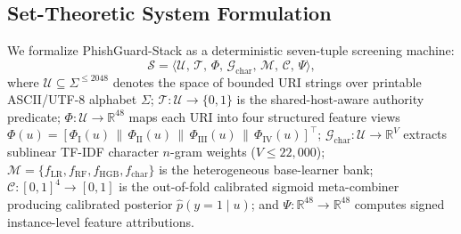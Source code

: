 \documentclass[conference]{IEEEtran}
\begin{document}
\subsection{Set-Theoretic System Formulation}
We formalize PhishGuard-Stack as a deterministic seven-tuple screening machine:
\begin{equation}
\mathcal{S} = \langle \mathcal{U},\, \mathcal{T},\, \Phi,\, \mathcal{G}_{\text{char}},\, \mathcal{M},\, \mathcal{C},\, \Psi \rangle,
\label{eq:tuple}
\end{equation}
where $\mathcal{U} \subseteq \Sigma^{\le 2048}$ denotes the space of bounded URI strings over printable ASCII/UTF-8 alphabet $\Sigma$; $\mathcal{T}: \mathcal{U} \to \{0,1\}$ is the shared-host-aware authority predicate; $\Phi: \mathcal{U} \to \mathbb{R}^{48}$ maps each URI into four structured feature views $\Phi(u) = [\Phi_{\text{I}}(u) \,\|\, \Phi_{\text{II}}(u) \,\|\, \Phi_{\text{III}}(u) \,\|\, \Phi_{\text{IV}}(u)]^\top$; $\mathcal{G}_{\text{char}}: \mathcal{U} \to \mathbb{R}^{V}$ extracts sublinear TF-IDF character $n$-gram weights ($V \le 22{,}000$); $\mathcal{M} = \{f_{\text{LR}}, f_{\text{RF}}, f_{\text{HGB}}, f_{\text{char}}\}$ is the heterogeneous base-learner bank; $\mathcal{C}: [0,1]^4 \to [0,1]$ is the out-of-fold calibrated sigmoid meta-combiner producing calibrated posterior $\hat{p}(y=1 \mid u)$; and $\Psi: \mathbb{R}^{48} \to \mathbb{R}^{48}$ computes signed instance-level feature attributions.
\end{document}
